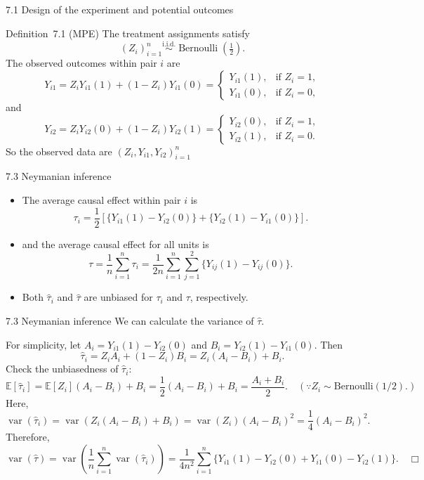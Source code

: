 \documentclass[aspectratio=169, 12pt]{beamer}
\begin{document}
\begin{frame}{7.1 Design of the experiment and potential outcomes}
    \small
    \begin{keybox}{Definition~7.1 (MPE)}
        \label{def-7-1}
        The treatment assignments satisfy
        \[
        (Z_i)_{i=1}^n \overset{\text{i.i.d.}}{\sim} \operatorname{Bernoulli}\left(\tfrac{1}{2}\right).
        \]
        The observed outcomes within pair $i$ are
        \[
        Y_{i1} = Z_i Y_{i1}(1) + (1 - Z_i) Y_{i1}(0) =
        \begin{cases}
            Y_{i1}(1), & \text{if } Z_i = 1, \\
            Y_{i1}(0), & \text{if } Z_i = 0,
        \end{cases}
        \]
        and
        \[
        Y_{i2} = Z_i Y_{i2}(0) + (1 - Z_i) Y_{i2}(1) =
        \begin{cases}
            Y_{i2}(0), & \text{if } Z_i = 1, \\
            Y_{i2}(1), & \text{if } Z_i = 0.
        \end{cases}
        \]
        So the observed data are $(Z_i,Y_{i1},Y_{i2})_{i=1}^n$
        \label{def-7-1}
    \end{keybox}
\end{frame}

\begin{frame}{7.3 Neymanian inference}
    \begin{itemize}
        \item The average causal effect within pair $i$ is 
        \[
        \tau_i = \frac{1}{2}\left[\{Y_{i1}(1)-Y_{i2}(0)\} + \{Y_{i2}(1)-Y_{i1}(0)\}\right].
        \]
        \item and the average causal effect for all units is
        \[
        \tau = \frac{1}{n}\sum_{i=1}^{n}\tau_i = \frac{1}{2n}\sum_{i=1}^{n}\sum_{j=1}^{2}\{Y_{ij}(1)-Y_{ij}(0)\}.
        \]
        \item Both $\hat{\tau}_i$ and $\hat{\tau}$ are unbiased for $\tau_i$ and $\tau$, respectively.
    \end{itemize}
\end{frame}

\begin{frame}{7.3 Neymanian inference}
    We can calculate the variance of $\hat{\tau}$.

    For simplicity, let $A_i=Y_{i1}(1)-Y_{i2}(0)$ and $B_i=Y_{i2}(1)-Y_{i1}(0)$. Then
    \[
    \hat{\tau}_i = Z_iA_i + (1-Z_i)B_i = Z_i(A_i-B_i)+B_i.
    \]
    Check the unbiasedness of $\hat{\tau}_i$: $$\mathbb{E}[\hat{\tau}_i] = \mathbb{E}[Z_i](A_i-B_i)+B_i = \dfrac{1}{2}(A_i-B_i)+B_i = \dfrac{A_i+B_i}{2}.\quad (\because Z_i\sim \text{Bernoulli}(1/2).)$$
    Here, $\operatorname{var}(\hat{\tau}_i) = \operatorname{var}(Z_i(A_i-B_i)+B_i) = \operatorname{var}(Z_i)(A_i-B_i)^2=\dfrac{1}{4}(A_i-B_i)^2.$ Therefore, 
    \[
    \operatorname{var}(\hat{\tau}) = \operatorname{var}\left(\frac{1}{n}\sum_{i=1}^{n}\operatorname{var}(\hat{\tau}_i)\right) = \frac{1}{4n^2}\sum_{i=1}^{n}\{Y_{i1}(1)-Y_{i2}(0) + Y_{i1}(0) - Y_{i2}(1)\}. \quad\Box
    \]
\end{frame}
\end{document}
